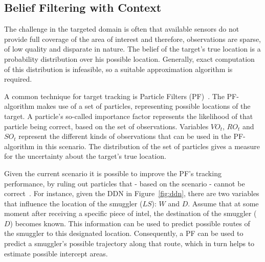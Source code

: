 \documentclass[conference]{IEEEtran}
\begin{document}
\subsection{Belief Filtering with Context}
\label{subsec:belief-filter}

The challenge in the targeted domain is often that available sensors do not provide full coverage of the area of interest and therefore, observations are sparse, of low quality and disparate in nature. The belief of the target's true location is a probability distribution over his possible location. Generally, exact computation of this distribution is infeasible, so a suitable approximation algorithm is required.

A common technique for target tracking is Particle Filters (PF)~\cite{Blackman1999}. The PF-algorithm makes use of a set of particles, representing possible locations of the target. A particle's so-called importance factor represents the likelihood of that particle being correct, based on the set of observations. Variables $VO_t$, $RO_t$ and $SO_t$ represent the different kinds of observations that can be used in the PF-algorithm in this scenario. The distribution of the set of particles gives a measure for the uncertainty about the target's true location.

Given the current scenario it is possible to improve the PF's tracking performance, by ruling out particles that - based on the scenario - cannot be correct~\cite{Claessens2015}. For instance, given the DDN in Figure~\ref{fig:ddn}, there are two variables that influence the location of the smuggler ($LS$): $W$ and $D$. Assume that at some moment after receiving a specific piece of intel, the destination of the smuggler ($D$) becomes known. This information can be used to predict possible routes of the smuggler to this designated location. Consequently, a PF can be used to predict a smuggler's possible trajectory along that route, which in turn helps to estimate possible intercept areas.


\end{document}
